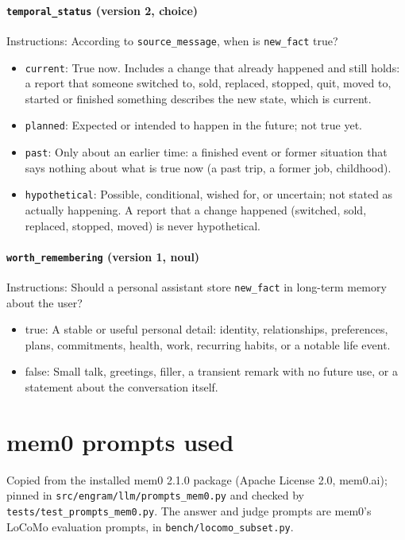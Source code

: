 \documentclass[11pt]{article}
\begin{document}
\paragraph{\texttt{temporal\_\allowbreak{}status} (version 2, choice)}
Instructions: According to \texttt{source\_\allowbreak{}message}, when is \texttt{new\_\allowbreak{}fact} true?

\begin{itemize}
\item \texttt{current}: True now. Includes a change that already happened and still holds: a report that someone switched to, sold, replaced, stopped, quit, moved to, started or finished something describes the new state, which is current.
\item \texttt{planned}: Expected or intended to happen in the future; not true yet.
\item \texttt{past}: Only about an earlier time: a finished event or former situation that says nothing about what is true now (a past trip, a former job, childhood).
\item \texttt{hypothetical}: Possible, conditional, wished for, or uncertain; not stated as actually happening. A report that a change happened (switched, sold, replaced, stopped, moved) is never hypothetical.
\end{itemize}
\paragraph{\texttt{worth\_\allowbreak{}remembering} (version 1, noul)}
Instructions: Should a personal assistant store \texttt{new\_\allowbreak{}fact} in long-term memory about the user?

\begin{itemize}
\item true: A stable or useful personal detail: identity, relationships, preferences, plans, commitments, health, work, recurring habits, or a notable life event.
\item false: Small talk, greetings, filler, a transient remark with no future use, or a statement about the conversation itself.
\end{itemize}
\section{mem0 prompts used}
Copied from the installed mem0 2.1.0 package (Apache License 2.0, \textcopyright{} mem0.ai); pinned in \texttt{src/engram/llm/prompts\_\allowbreak{}mem0.py} and checked by \texttt{tests/test\_\allowbreak{}prompts\_\allowbreak{}mem0.py}. The answer and judge prompts are mem0's LoCoMo evaluation prompts, in \texttt{bench/locomo\_\allowbreak{}subset.py}.
\end{document}
